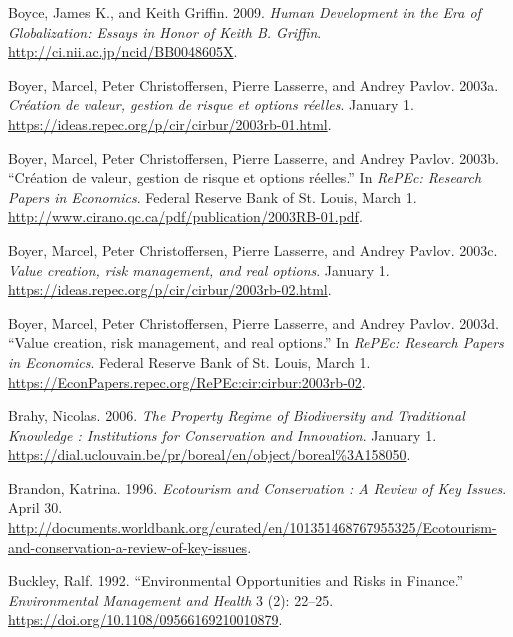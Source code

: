 \begin{CSLReferences}{1}{1}
Boyce, James K., and Keith Griffin. 2009. \emph{Human Development in the
Era of Globalization: Essays in Honor of Keith B. Griffin}.
\url{http://ci.nii.ac.jp/ncid/BB0048605X}.

Boyer, Marcel, Peter Christoffersen, Pierre Lasserre, and Andrey Pavlov.
2003a. \emph{Création de valeur, gestion de risque et options réelles}.
January 1. \url{https://ideas.repec.org/p/cir/cirbur/2003rb-01.html}.

Boyer, Marcel, Peter Christoffersen, Pierre Lasserre, and Andrey Pavlov.
2003b. {``Création de valeur, gestion de risque et options réelles.''}
In \emph{RePEc: Research Papers in Economics}. Federal Reserve Bank of
St. Louis, March 1.
\url{http://www.cirano.qc.ca/pdf/publication/2003RB-01.pdf}.

Boyer, Marcel, Peter Christoffersen, Pierre Lasserre, and Andrey Pavlov.
2003c. \emph{Value creation, risk management, and real options}. January
1. \url{https://ideas.repec.org/p/cir/cirbur/2003rb-02.html}.

Boyer, Marcel, Peter Christoffersen, Pierre Lasserre, and Andrey Pavlov.
2003d. {``Value creation, risk management, and real options.''} In
\emph{RePEc: Research Papers in Economics}. Federal Reserve Bank of St.
Louis, March 1.
\url{https://EconPapers.repec.org/RePEc:cir:cirbur:2003rb-02}.

Brahy, Nicolas. 2006. \emph{The Property Regime of Biodiversity and
Traditional Knowledge : Institutions for Conservation and Innovation}.
January 1.
\url{https://dial.uclouvain.be/pr/boreal/en/object/boreal\%3A158050}.

Brandon, Katrina. 1996. \emph{Ecotourism and Conservation : A Review of
Key Issues}. April 30.
\url{http://documents.worldbank.org/curated/en/101351468767955325/Ecotourism-and-conservation-a-review-of-key-issues}.

Buckley, Ralf. 1992. {``Environmental Opportunities and Risks in
Finance.''} \emph{Environmental Management and Health} 3 (2): 22--25.
\url{https://doi.org/10.1108/09566169210010879}.


\end{CSLReferences}
